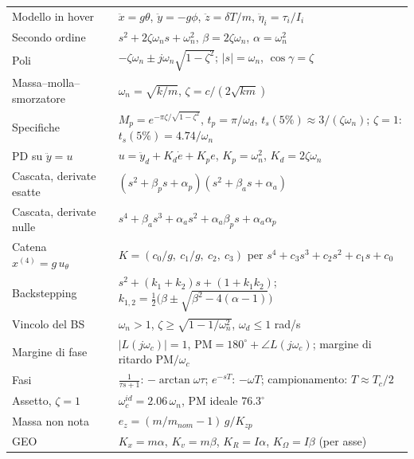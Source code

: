 \documentclass[11pt,a4paper]{article}
\begin{document}
\begin{center}
\renewcommand{\arraystretch}{1.55}
\begin{tabularx}{\textwidth}{@{}lL@{}}
\toprule
Modello in hover & $\ddot x = g\theta$, $\ddot y = -g\phi$, $\ddot z = \delta T/m$, $\ddot\eta_i = \tau_i/I_i$ \\
Secondo ordine & $s^2 + 2\zeta\omega_n s + \omega_n^2$, \quad $\beta = 2\zeta\omega_n$, \quad $\alpha = \omega_n^2$ \\
Poli & $-\zeta\omega_n \pm j\omega_n\sqrt{1-\zeta^2}$; \quad $|s| = \omega_n$, \quad $\cos\gamma = \zeta$ \\
Massa--molla--smorzatore & $\omega_n = \sqrt{k/m}$, \quad $\zeta = c/(2\sqrt{km})$ \\
Specifiche & $M_p = e^{-\pi\zeta/\sqrt{1-\zeta^2}}$, \quad $t_p = \pi/\omega_d$, \quad $t_s(5\%) \approx 3/(\zeta\omega_n)$; \quad $\zeta = 1$: $t_s(5\%) = 4.74/\omega_n$ \\
PD su $\ddot y = u$ & $u = \ddot y_d + K_d\dot e + K_p e$, \quad $K_p = \omega_n^2$, \quad $K_d = 2\zeta\omega_n$ \\
Cascata, derivate esatte & $(s^2 + \beta_p s + \alpha_p)(s^2 + \beta_a s + \alpha_a)$ \\
Cascata, derivate nulle & $s^4 + \beta_a s^3 + \alpha_a s^2 + \alpha_a\beta_p s + \alpha_a\alpha_p$ \\
Catena $x^{(4)} = g\,u_\theta$ & $K = (c_0/g,\ c_1/g,\ c_2,\ c_3)$ per $s^4 + c_3 s^3 + c_2 s^2 + c_1 s + c_0$ \\
Backstepping & $s^2 + (k_1+k_2)s + (1 + k_1k_2)$; \quad $k_{1,2} = \tfrac12\big(\beta \pm \sqrt{\beta^2 - 4(\alpha-1)}\big)$ \\
Vincolo del BS & $\omega_n > 1$, \quad $\zeta \ge \sqrt{1 - 1/\omega_n^2}$, \quad $\omega_d \le 1$ rad/s \\
Margine di fase & $|L(j\omega_c)| = 1$, \quad $\mathrm{PM} = 180^\circ + \angle L(j\omega_c)$; \quad margine di ritardo $\mathrm{PM}/\omega_c$ \\
Fasi & $\frac{1}{\tau s + 1}$: $-\arctan\omega\tau$; \quad $e^{-sT}$: $-\omega T$; \quad campionamento: $T \approx T_c/2$ \\
Assetto, $\zeta = 1$ & $\omega_c^{id} = 2.06\,\omega_n$, \quad PM ideale $76.3^\circ$ \\
Massa non nota & $e_z = (m/m_{nom} - 1)\,g/K_{zp}$ \\
GEO & $K_x = m\alpha$, $K_v = m\beta$, $K_R = I\alpha$, $K_\Omega = I\beta$ (per asse) \\
\bottomrule
\end{tabularx}
\end{center}
\end{document}
